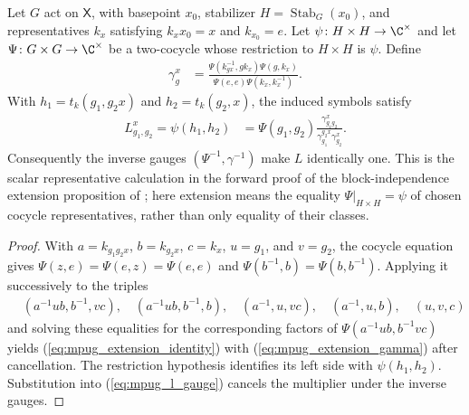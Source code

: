 \begin{lemma}
    \label{thm:mpug_stabilizer_extension_gauge}
    \leanok
    Let $G$ act on $\mathsf X$, with basepoint $x_0$, stabilizer
    $H=\operatorname{Stab}_G(x_0)$, and representatives $k_x$ satisfying
    $k_xx_0=x$ and $k_{x_0}=e$.
    Let $\psi\colon H\times H\to\C^\times$ and let
    $\Psi\colon G\times G\to\C^\times$ be a two-cocycle whose restriction
    to $H\times H$ is $\psi$. Define
    \begin{align}
        \gamma_g^x
         & =\frac{\Psi(k_{gx}^{-1},gk_x)\Psi(g,k_x)}
            {\Psi(e,e)\Psi(k_x,k_x^{-1})}.
        \label{eq:mpug_extension_gamma}
    \end{align}
    With $h_1=t_k(g_1,g_2x)$ and $h_2=t_k(g_2,x)$, the induced symbols satisfy
    \begin{align}
        L^x_{g_1,g_2}=\psi(h_1,h_2)
         & =\Psi(g_1,g_2)\frac{\gamma_{g_1g_2}^x}
                         {\gamma_{g_1}^{g_2x}\gamma_{g_2}^x}.
        \label{eq:mpug_extension_identity}
    \end{align}
    Consequently the inverse gauges
    $(\Psi^{-1},\gamma^{-1})$ make $L$ identically one.
    This is the scalar representative calculation in the forward proof of
    the block-independence extension proposition of
    \cite{FrancoRubio2025MPUGauging};
    here extension means the equality $\Psi|_{H\times H}=\psi$ of chosen
    cocycle representatives, rather than only equality of their classes.
\end{lemma}
\begin{proof}\leanok
    With $a=k_{g_1g_2x}$, $b=k_{g_2x}$, $c=k_x$, $u=g_1$, and $v=g_2$,
    the cocycle equation gives $\Psi(z,e)=\Psi(e,z)=\Psi(e,e)$ and
    $\Psi(b^{-1},b)=\Psi(b,b^{-1})$. Applying it successively to the triples
    \begin{align}
         & (a^{-1}ub,b^{-1},vc),\quad (a^{-1}ub,b^{-1},b),\quad
        (a^{-1},u,vc),\quad (a^{-1},u,b),\quad (u,v,c)
    \end{align}
    and solving these equalities for the corresponding factors of
    $\Psi(a^{-1}ub,b^{-1}vc)$ yields
    (\ref{eq:mpug_extension_identity}) with
    (\ref{eq:mpug_extension_gamma}) after cancellation. The restriction
    hypothesis identifies its left side with $\psi(h_1,h_2)$. Substitution into
    (\ref{eq:mpug_l_gauge}) cancels the multiplier under the inverse gauges.
\end{proof}

